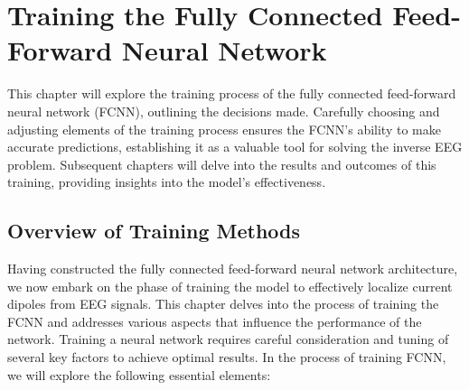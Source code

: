 \documentclass[a4paper, UKenglish, 11pt]{uiomaster}
\begin{document}
\chapter{Training the Fully Connected Feed-Forward Neural Network} \label{chap:training_FCNN}

This chapter will explore the training process of the fully connected feed-forward neural network (FCNN), outlining the decisions made. Carefully choosing and adjusting elements of the training process ensures the FCNN's ability to make accurate predictions, establishing it as a valuable tool for solving the inverse EEG problem. Subsequent chapters will delve into the results and outcomes of this training, providing insights into the model's effectiveness.

\section{Overview of Training Methods}
Having constructed the fully connected feed-forward neural network architecture, we now embark on the phase of training the model to effectively localize current dipoles from EEG signals. This chapter delves into the process of training the FCNN and addresses various aspects that influence the performance of the network. Training a neural network requires careful consideration and tuning of several key factors to achieve optimal results. In the process of training FCNN, we will explore the following essential elements:
\end{document}
